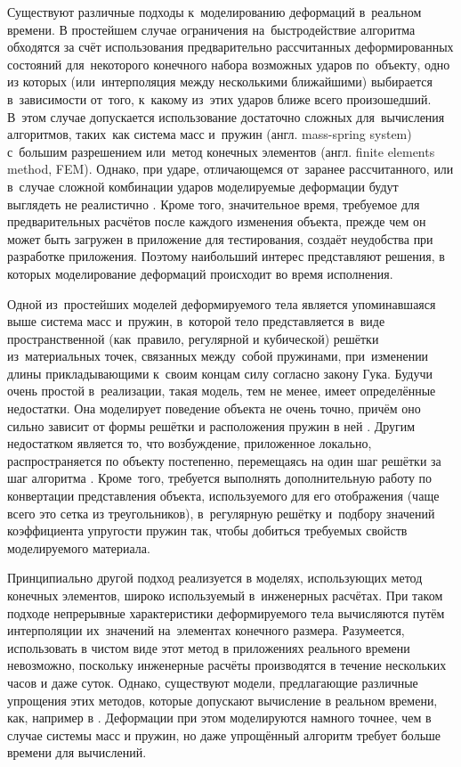 \documentclass[a4paper, 14pt, titlepage]{extarticle}
\newcommand{\eng}[1]{{\English #1}}
\begin{document}
    Существуют различные подходы к~моделированию деформаций в~реальном времени. В простейшем случае
    ограничения на~быстродействие алгоритма обходятся за счёт использования предварительно рассчитанных
    деформированных состояний для~некоторого конечного набора возможных ударов по~объекту, одно из которых
    (или~интерполяция между несколькими ближайшими) выбирается в~зависимости от~того, к~какому
    из~этих ударов ближе всего произошедший. В~этом случае допускается использование достаточно сложных
    для~вычисления алгоритмов, таких~как система масс и~пружин (англ. \eng{mass-spring system})
    с~большим разрешением или~метод конечных элементов (англ. \eng{finite elements method, FEM}).
    Однако, при ударе, отличающемся от~заранее рассчитанного, или в~случае сложной комбинации ударов
    моделируемые деформации будут выглядеть не реалистично \cite[с.~1064]{chang-crash}. Кроме того, значительное время, требуемое
    для предварительных расчётов после каждого изменения объекта, прежде чем он может быть загружен
    в приложение для тестирования, создаёт неудобства при разработке приложения. Поэтому наибольший
    интерес представляют решения, в которых моделирование деформаций происходит во время исполнения.

    Одной из~простейших моделей деформируемого тела является упоминавшаяся выше система масс
    и~пружин, в~которой тело представляется в~виде пространственной (как~правило, регулярной и
    кубической) решётки из~материальных точек, связанных между~собой пружинами, при~изменении длины
    прикладывающими к~своим концам силу согласно закону Гука. Будучи очень простой в~реализации,
    такая модель, тем не менее, имеет определённые недостатки. Она моделирует поведение объекта не
    очень точно, причём оно сильно зависит от формы решётки и расположения пружин в ней \cite[с.~8]{mueller-physmodels}.
    Другим недостатком является то, что возбуждение, приложенное локально, распространяется по
    объекту постепенно, перемещаясь на один шаг решётки за шаг алгоритма \cite[с.~232]{parent-animation}.
    Кроме~того, требуется выполнять дополнительную работу по конвертации представления объекта,
    используемого для его отображения (чаще всего это сетка из треугольников), в~регулярную решётку
    и~подбору значений коэффициента упругости пружин так, чтобы добиться требуемых свойств
    моделируемого материала.

    Принципиально другой подход реализуется в моделях, использующих метод конечных элементов, широко
    используемый в~инженерных расчётах. При таком подходе
    непрерывные характеристики деформируемого тела вычисляются путём интерполяции их~значений
    на~элементах конечного размера. Разумеется, использовать в чистом виде этот метод
    в приложениях реального времени невозможно, поскольку инженерные расчёты производятся в
    течение нескольких часов и даже суток. Однако, существуют модели, предлагающие различные упрощения этих
    методов, которые допускают вычисление в реальном времени, как, например в \cite{mueller-stable}.
    Деформации при этом моделируются намного точнее, чем в случае системы масс и пружин, но даже
    упрощённый алгоритм требует больше времени для вычислений. %
\end{document}
